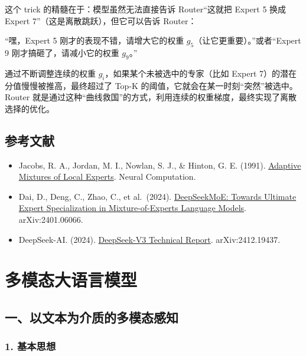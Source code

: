 这个 trick 的精髓在于：模型虽然无法直接告诉 Router``这就把 Expert 5 换成 Expert 7''（这是离散跳跃），但它可以告诉 Router：

``嘿，Expert 5 刚才的表现不错，请增大它的权重 \(g_5\)（让它更重要）。''或者``Expert 9 刚才搞砸了，请减小它的权重 \(g_9\)。''

通过不断调整连续的权重 \(g_i\)，如果某个未被选中的专家（比如 Expert 7）的潜在分值慢慢被推高，最终超过了 Top-K 的阈值，它就会在某一时刻``突然''被选中。Router 就是通过这种``曲线救国''的方式，利用连续的权重梯度，最终实现了离散选择的优化。

\hypertarget{ux53c2ux8003ux6587ux732e-75}{%
\subsection{参考文献}\label{ux53c2ux8003ux6587ux732e-75}}

\begin{itemize}
\tightlist
\item
  Jacobs, R. A., Jordan, M. I., Nowlan, S. J., \& Hinton, G. E. (1991). \href{https://doi.org/10.1162/neco.1991.3.1.79}{Adaptive Mixtures of Local Experts}. Neural Computation.
\item
  Dai, D., Deng, C., Zhao, C., et al.~(2024). \href{https://arxiv.org/abs/2401.06066}{DeepSeekMoE: Towards Ultimate Expert Specialization in Mixture-of-Experts Language Models}. arXiv:2401.06066.
\item
  DeepSeek-AI. (2024). \href{https://arxiv.org/abs/2412.19437}{DeepSeek-V3 Technical Report}. arXiv:2412.19437.
\end{itemize}

\clearpage

\hypertarget{ux591aux6a21ux6001ux5927ux8bedux8a00ux6a21ux578b}{%
\section{多模态大语言模型}\label{ux591aux6a21ux6001ux5927ux8bedux8a00ux6a21ux578b}}

\hypertarget{ux4e00ux4ee5ux6587ux672cux4e3aux4ecbux8d28ux7684ux591aux6a21ux6001ux611fux77e5}{%
\subsection{一、以文本为介质的多模态感知}\label{ux4e00ux4ee5ux6587ux672cux4e3aux4ecbux8d28ux7684ux591aux6a21ux6001ux611fux77e5}}

\hypertarget{ux57faux672cux601dux60f3}{%
\subsubsection{1. 基本思想}\label{ux57faux672cux601dux60f3}}

